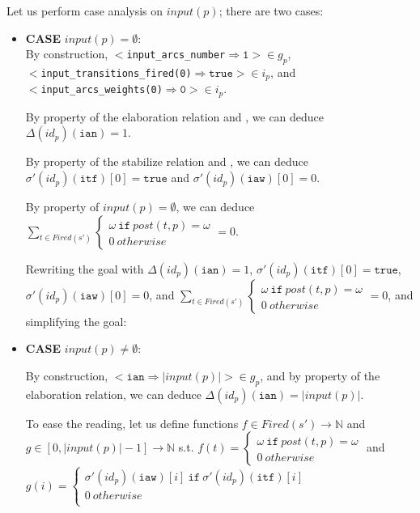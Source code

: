\documentclass[dvipsnames,12pt]{article}
\begin{document}
\begin{niproof}
  Let us perform case analysis on $input(p)$; there are two cases:
  
  \begin{itemize}
  \item \textbf{CASE} $input(p)=\emptyset$:\\
    
    By construction,
    ${<}$\texttt{input\_arcs\_number}$\mathtt{\Rightarrow{}1}{>}\in{}g_p$,\\
    ${<}$\texttt{input\_transitions\_fired(0)}$\Rightarrow{}\mathtt{true}{>}\in{}i_p$,
    and\\
    ${<}$\texttt{input\_arcs\_weights(0)}$\mathtt{\Rightarrow{}0}{>}\in{}i_p$.

    By property of the elaboration relation and \InCsCompP, we can
    deduce $\Delta(id_p)(\texttt{ian})=1$.
    
    By property of the stabilize relation and \InCsCompP, we can deduce
    $\sigma'(id_p)(\texttt{itf})[0]=\mathtt{true}$ and
    $\sigma'(id_p)(\texttt{iaw})[0]=0$.

    By property of $input(p)=\emptyset$, we can deduce
    $\sum\limits_{t\in{}Fired(s')}
    \begin{cases}
      \omega~\mathtt{if}~post(t,p)=\omega \\
      0~otherwise
    \end{cases}=0$.

    \noindent{}Rewriting the goal with $\Delta(id_p)(\texttt{ian})=1$,
    $\sigma'(id_p)(\texttt{itf})[0]=\mathtt{true}$,
    $\sigma'(id_p)(\texttt{iaw})[0]=0$, and $\sum\limits_{t\in{}Fired(s')}
    \begin{cases}
      \omega~\mathtt{if}~post(t,p)=\omega \\
      0~otherwise
    \end{cases}=0$, and simplifying the goal: 
    
  \item \textbf{CASE} $input(p)\neq\emptyset$:

    \noindent{}By construction,
    ${<}\mathtt{ian\Rightarrow{}}\vert{}input(p)\vert{>}\in{}g_p$, and
    by property of the elaboration relation, we can deduce
    \label{eq:24}$\Delta(id_p)(\texttt{ian})=\vert{}input(p)\vert$.

    \noindent{}To ease the reading, let us define functions
    $f\in{}Fired(s')\rightarrow\mathbb{N}$ and
    $g\in[0,\vert{}input(p)\vert-1]\rightarrow\mathbb{N}$ s.t.
    $f(t)=\begin{cases}
      \omega~\mathtt{if}~post(t,p)=\omega \\
      0~otherwise
    \end{cases}$ and $g(i)=\begin{cases}
      \sigma'(id_p)(\texttt{iaw})[i]~\mathtt{if}~\sigma'(id_p)(\texttt{itf})[i]\\
      0~otherwise \\
    \end{cases}$


\end{itemize}
\end{niproof}
\end{document}
